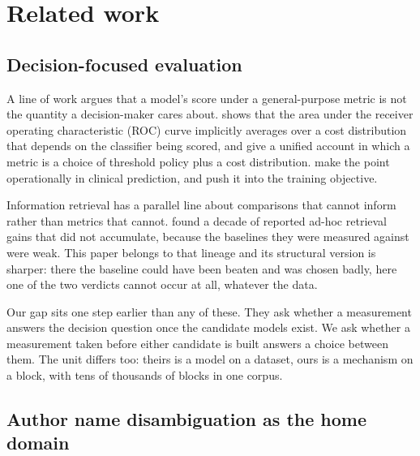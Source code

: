 \documentclass[11pt]{article}
\begin{document}
\section{Related work}
\label{sec:related}

\subsection{Decision-focused evaluation}
\label{sec:decision-focused}

A line of work argues that a model's score under a general-purpose metric is
not the quantity a decision-maker cares about. \citet{hand2009} shows that the
area under the receiver operating characteristic (ROC) curve implicitly
averages over a cost distribution that depends on the classifier being
scored, and \citet{hernandezorallo2012} give a
unified account in which a metric is a choice of threshold policy plus a cost
distribution. \citet{vickers2006} make the point operationally in clinical
prediction, and \citet{elmachtoub2022} push it into the training objective.

Information retrieval has a parallel line about comparisons that cannot inform
rather than metrics that cannot. \citet{armstrong2009} found a decade of
reported ad-hoc retrieval gains that did not accumulate, because the baselines
they were measured against were weak. This paper belongs to that lineage and
its structural version is sharper: there the baseline could have been beaten
and was chosen badly, here one of the two verdicts cannot occur at all,
whatever the data.

Our gap sits one step earlier than any of these. They ask whether a
measurement answers the decision question once the candidate models exist. We
ask whether a measurement taken before either candidate is built answers a
choice between them. The unit differs too: theirs is a model on a dataset,
ours is a mechanism on a block, with tens of thousands of blocks in one
corpus.

\subsection{Author name disambiguation as the home domain}
\label{sec:and-domain}
\end{document}

